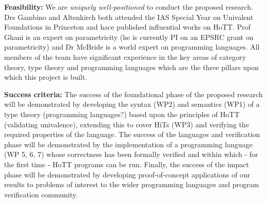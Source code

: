 \documentclass[a4paper,11pt]{article}
\begin{document}
\vspace*{0.02in}

{\bf Feasibility:} We are {\em uniquely well-positioned} to conduct
the proposed research. Drs Gambino and Altenkirch both attended the
IAS Special Year on Univalent Foundations in Princeton and hace
published influential works on HoTT. Prof Ghani is an expert on
parametricity (he is currently PI on an EPSRC grant on parametricity)
and Dr McBride is a world expert on programming languages. All members
of the team have significant experience in the key areas of category
theory, type theory and programming languages which are the three
pillars upon which this project is built.

\vspace*{0.02in}

{\bf Success criteria:} The success of the foundational phase of the proposed
research will be demonstrated by developing the syntax (WP2) and
semantics (WP1) 
of a type theory (programming languages?) based upon the principles of HoTT
(validating univalence), extending this to cover HiTs (WP3) and 
verifying the required properties of the language.
The success of the languages and verification phase will be
demonstrated by the implementation of a programming language (WP 5, 6, 7)  whose
correctness has been formally verified and within which - for the
first time - HoTT programs can be run. Finally, the success of the impact phase
will be demonstrated by developing proof-of-concept applications of
our results to problems of interest to the wider programming languages
and program verification community.

\vspace*{0.02in}
\end{document}
